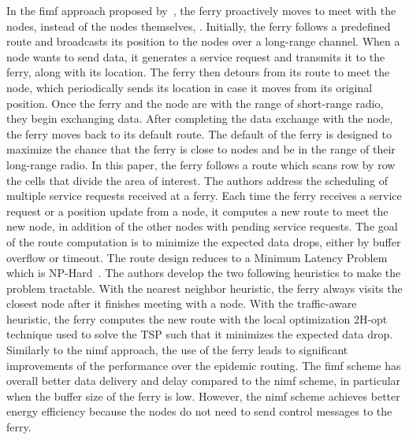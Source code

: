 In the \acrfull{fimf} approach proposed by~\cite{zhao2004message}, the ferry proactively moves to meet with the nodes, instead of the nodes themselves, . Initially, the ferry follows a predefined route and broadcasts its position to the nodes over a long-range channel. When a node wants to send data, it generates a service request and transmits it to the ferry, along with its location. The ferry then detours from its route to meet the node, which periodically sends its location in case it moves from its original position. Once the ferry and the node are with the range of short-range radio, they begin exchanging data. After completing the data exchange with the node, the ferry moves back to its default route. The default of the ferry is designed to maximize the chance that the ferry is close to nodes and be in the range of their long-range radio. In this paper, the ferry follows a route which scans row by row the cells that divide the area of interest. The authors address the scheduling of multiple service requests received at a ferry. Each time the ferry receives a service request or a position update from a node, it computes a new route to meet the new node, in addition of the other nodes with pending service requests. The goal of the route computation is to minimize the expected data drops, either by buffer overflow or timeout. The route design reduces to a Minimum Latency Problem which is NP-Hard~\cite{blum1994minimum}. The authors develop the two following heuristics to make the problem tractable. With the nearest neighbor heuristic, the ferry always visits the closest node after it finishes meeting with a node. With the traffic-aware heuristic, the ferry computes the new route with the local optimization 2H-opt technique used to solve the TSP such that it minimizes the expected data drop. Similarly to the \acrshort{nimf} approach, the use of the ferry leads to significant improvements of the performance over the epidemic routing. The \acrshort{fimf} scheme has overall better data delivery and delay compared to the \acrshort{nimf} scheme, in particular when the buffer size of the ferry is low. However, the \acrshort{nimf} scheme achieves better energy efficiency because the nodes do not need to send control messages to the ferry. 


